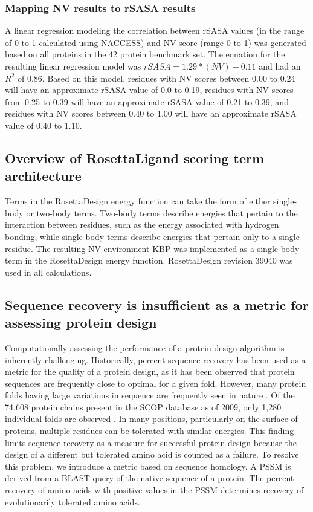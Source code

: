 \subsubsection{Mapping \acs{NV} results to \acs{rSASA} results} 
A linear regression modeling the correlation between \ac{rSASA} values (in the range of 0 to 1 calculated using NACCESS) and \ac{NV} score (range 0 to 1) was generated based on all proteins in the 42 protein benchmark set.
The equation for the resulting linear regression model was $rSASA = 1.29*(NV)-0.11$ and had an $R^{2}$ of 0.86.
Based on this model, residues with \ac{NV} scores between 0.00 to 0.24 will have an approximate \ac{rSASA} value of 0.0 to 0.19, residues with \ac{NV} scores from 0.25 to 0.39 will have an approximate \ac{rSASA} value of 0.21 to 0.39, and residues with \ac{NV} scores between 0.40 to 1.00 will have an approximate \ac{rSASA} value of 0.40 to 1.10.

\subsection{Overview of RosettaLigand scoring term architecture}
Terms in the RosettaDesign energy function can take the form of either single-body or two-body terms.
Two-body terms describe energies that pertain to the interaction between residues, such as the energy associated with hydrogen bonding, while single-body terms describe energies that pertain only to a single residue.
The resulting \ac{NV} environment \ac{KBP} was implemented as a single-body term in the RosettaDesign energy function.
RosettaDesign revision 39040 was used in all calculations.  

\subsection{Sequence recovery is insufficient as a metric for assessing protein design}
Computationally assessing the performance of a protein design algorithm is inherently challenging.
Historically, percent sequence recovery has been used as a metric for the quality of a protein design, as it has been observed that protein sequences are frequently close to optimal for a given fold\citep{Kuhlman:2000tc}.
However, many protein folds having large variations in sequence are frequently seen in nature \citep{Chothia:1986tm}.
Of the 74,608 protein chains present in the \ac{SCOP} database as of 2009, only 1,280 individual folds are observed \citep{Schaeffer:2011fe}.
In many positions, particularly on the surface of proteins, multiple residues can be tolerated with similar energies.
This finding limits sequence recovery as a measure for successful protein design because the design of a different but tolerated amino acid is counted as a failure.
To resolve this problem, we introduce a metric based on sequence homology. A \ac{PSSM} is derived from a \ac{BLAST} query of the native sequence of a protein.
The percent recovery of amino acids with positive values in the \ac{PSSM} determines recovery of evolutionarily tolerated amino acids. 

